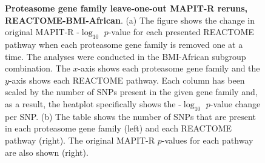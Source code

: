 \begin{figure}[ht]
\caption[TBD]{\textbf{Proteasome gene family leave-one-out MAPIT-R reruns, REACTOME-BMI-African}. (a) The figure shows the change in original MAPIT-R -$\log_{10}$ $p$-value for each presented REACTOME pathway when each proteasome gene family is removed one at a time. The analyses were conducted in the BMI-African subgroup combination. The $x$-axis shows each proteasome gene family and the $y$-axis shows each REACTOME pathway. Each column has been scaled by the number of SNPs present in the given gene family and, as a result, the heatplot specifically shows the -$\log_{10}$ $p$-value change per SNP. (b) The table shows the number of SNPs that are present in each proteasome gene family (left) and each REACTOME pathway (right). The original MAPIT-R $p$-values for each pathway are also shown (right).}
\label{InterPath-Supp-Figure-Prot-Heatplots-African}
\end{figure}
\clearpage
\addtocounter{figure}{-1}
\addtocounter{CharNumber5}{1}


